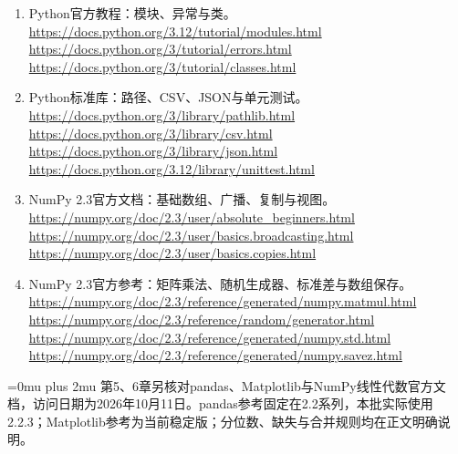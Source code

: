 \documentclass[UTF8,fontset=none,zihao=-4,a4paper]{ctexart}
\numberwithin{equation}{section}
\numberwithin{figure}{section}
\begin{document}
\begin{enumerate}
\item Python官方教程：模块、异常与类。\newline
\url{https://docs.python.org/3.12/tutorial/modules.html}\newline
\url{https://docs.python.org/3/tutorial/errors.html}\newline
\url{https://docs.python.org/3/tutorial/classes.html}
\item Python标准库：路径、CSV、JSON与单元测试。\newline
\url{https://docs.python.org/3/library/pathlib.html}\newline
\url{https://docs.python.org/3/library/csv.html}\newline
\url{https://docs.python.org/3/library/json.html}\newline
\url{https://docs.python.org/3.12/library/unittest.html}
\item NumPy 2.3官方文档：基础数组、广播、复制与视图。\newline
\url{https://numpy.org/doc/2.3/user/absolute_beginners.html}\newline
\url{https://numpy.org/doc/2.3/user/basics.broadcasting.html}\newline
\url{https://numpy.org/doc/2.3/user/basics.copies.html}
\item NumPy 2.3官方参考：矩阵乘法、随机生成器、标准差与数组保存。\newline
\url{https://numpy.org/doc/2.3/reference/generated/numpy.matmul.html}\newline
\url{https://numpy.org/doc/2.3/reference/random/generator.html}\newline
\url{https://numpy.org/doc/2.3/reference/generated/numpy.std.html}\newline
\url{https://numpy.org/doc/2.3/reference/generated/numpy.savez.html}
\end{enumerate}
\begingroup\Urlmuskip=0mu plus 2mu
第5、6章另核对pandas、Matplotlib与NumPy线性代数官方文档，访问日期为2026年10月11日。pandas参考固定在2.2系列，本批实际使用2.2.3；Matplotlib参考为当前稳定版；分位数、缺失与合并规则均在正文明确说明。
\end{document}
